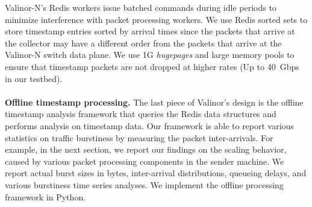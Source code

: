 Valinor-N's Redis workers issue batched commands during idle periods to minimize interference with packet processing workers. We use Redis sorted sets to store timestamp entries sorted by arrival times since the packets that arrive at the collector may have a different order from the packets that arrive at the Valinor-N switch data plane. 
We use 1G \textit{hugepages} and large memory pools to ensure that timestamp packets are not dropped at higher rates (Up to 40~Gbps in our testbed).
\\
\\
\textbf{Offline timestamp processing.} The last piece of Valinor's design is the offline timestamp analysis framework that queries the Redis data structures and performs analysis on timestamp data. Our framework is able to report various statistics on traffic burstiness by measuring the packet inter-arrivals. For example, in the next section, we report our findings on the scaling behavior, caused by various packet processing components in the sender machine. We report actual burst sizes in bytes, inter-arrival distributions, queueing delays, and various burstiness time series analyses. We implement the offline processing framework in Python.



